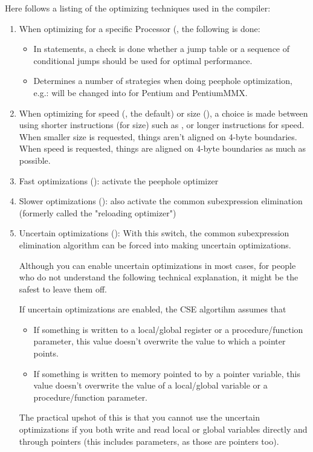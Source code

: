 Here follows a listing of the optimizing techniques used in the compiler:
\begin{enumerate}
\item When optimizing for a specific Processor (,
the following is done:
\begin{itemize}
\item In  statements, a check is done whether a jump table
or a sequence of conditional jumps should be used for optimal performance.
\item Determines a number of strategies when doing peephole optimization, e.g.:
 will be changed into
 for Pentium and PentiumMMX.
\end{itemize}
\item When optimizing for speed (, the default) or size (), a choice is
made between using shorter instructions (for size) such as ,
or longer instructions  for speed. When smaller size is
requested, things aren't aligned on 4-byte boundaries.  When speed is
requested, things are aligned on 4-byte boundaries as much as possible.
\item Fast optimizations (): activate the peephole optimizer
\item Slower optimizations (): also activate the common subexpression
elimination (formerly called the "reloading optimizer")
\item Uncertain optimizations (): With this switch, the common subexpression
elimination algorithm can be forced into making uncertain optimizations.

Although you can enable uncertain optimizations in most cases, for people who
do not understand the following technical explanation, it might be the safest to
leave them off.

\begin{remark}If uncertain optimizations are enabled, the CSE algortihm assumes
that
\begin{itemize}
\item If something is written to a local/global register or a
procedure/function parameter, this value doesn't overwrite the value to
which a pointer points.
\item If something is written to memory pointed to by a pointer variable,
this value doesn't overwrite the value of a local/global variable or a
procedure/function parameter.
\end{itemize}
\end{remark}
The practical upshot of this is that you cannot use the uncertain
optimizations if you both write and read local or global variables directly and
through pointers (this includes  parameters, as those are pointers too).


\end{enumerate}
